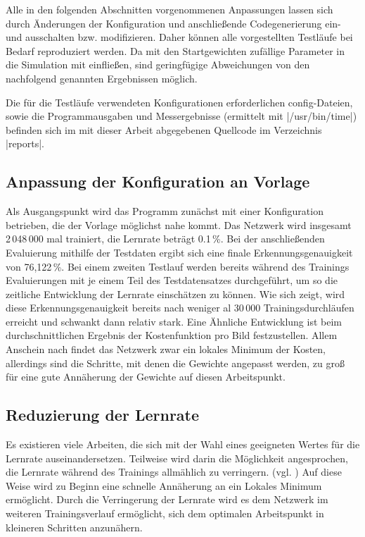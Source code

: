 \documentclass[../main.tex]{subfiles}
\begin{document}
Alle in den folgenden Abschnitten vorgenommenen Anpassungen lassen sich durch Änderungen der Konfiguration und anschließende Codegenerierung ein- und ausschalten bzw. modifizieren. Daher können alle vorgestellten Testläufe bei Bedarf reproduziert werden. Da mit den Startgewichten zufällige Parameter in die Simulation mit einfließen, sind geringfügige Abweichungen von den nachfolgend genannten Ergebnissen möglich. 

Die für die Testläufe verwendeten Konfigurationen erforderlichen config-Dateien, sowie die Programmausgaben und Messergebnisse (ermittelt mit |/usr/bin/time|) befinden sich im mit dieser Arbeit abgegebenen Quellcode im Verzeichnis |reports|. 

\subsection{Anpassung der Konfiguration an Vorlage}
Als Ausgangspunkt wird das Programm zunächst mit einer Konfiguration betrieben, die der Vorlage möglichst nahe kommt. Das Netzwerk wird insgesamt 2\,048\,000 mal trainiert, die Lernrate beträgt 0.1\,\%.  Bei der anschließenden Evaluierung mithilfe der Testdaten ergibt sich eine finale Erkennungsgenauigkeit von 76,122\,\%. Bei einem zweiten Testlauf werden bereits während des Trainings Evaluierungen mit je einem Teil des Testdatensatzes durchgeführt, um so die zeitliche Entwicklung der Lernrate einschätzen zu können. Wie sich zeigt, wird diese Erkennungsgenauigkeit bereits nach weniger al 30\,000 Trainingsdurchläufen erreicht und schwankt dann relativ stark. Eine Ähnliche Entwicklung ist beim durchschnittlichen Ergebnis der Kostenfunktion pro Bild festzustellen. Allem Anschein nach findet das Netzwerk zwar ein lokales Minimum der Kosten, allerdings sind die Schritte, mit denen die Gewichte angepasst werden, zu groß für eine gute Annäherung der Gewichte auf diesen Arbeitspunkt. 

\subsection{Reduzierung der Lernrate}
Es existieren viele Arbeiten, die sich mit der Wahl eines geeigneten Wertes für die Lernrate auseinandersetzen. Teilweise wird darin die Möglichkeit angesprochen, die Lernrate während des Trainings allmählich zu verringern. (vgl. \cite{sparseAutoencoder}) Auf diese Weise wird zu Beginn eine schnelle Annäherung an ein Lokales Minimum ermöglicht. Durch die Verringerung der Lernrate wird es dem Netzwerk im weiteren Trainingsverlauf ermöglicht, sich dem optimalen Arbeitspunkt in kleineren Schritten anzunähern. 
\end{document}
